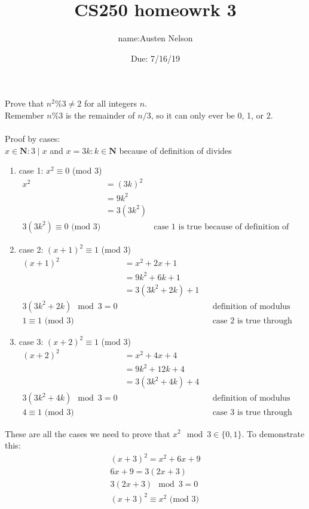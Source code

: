 \documentclass{exam}
\title{CS250 homeowrk 3}
\author{name:Austen Nelson}
\date{Due: 7/16/19}
\newcommand\N{\mathbf{N}}
\begin{document}
\maketitle

\begin{questions}

\question
Prove that $n^2\%3 \ne 2$ for all integers $n$.\\
Remember $n\%3$ is the remainder of $n/3$, so it can only ever be 0, 1, or 2. \\\\
Proof by cases: \\
$x \in \N \colon 3 \mid x$ and $x = 3k \colon k \in \N$  because of definition of divides \\
   \begin{enumerate}
      \item case 1: ${x^2 \equiv 0}$ (mod 3)
   \begin{align*}
      x^2 &= (3k)^2 &&\\
         &= 9k^2 &&\\
         &= 3(3k^2) &&\\
      {3(3k^2) \equiv 0} \text{ (mod 3)} && \text{case 1 is true because of definition of modulus}
   \end{align*}
\item case 2: ${(x+1)^2 \equiv 1}$ (mod 3)
      \begin{align*}
         (x+1)^2 &= x^2+2x+1 \\
            &= 9k^2 +6k + 1 \\
            &= 3(3k^2+2k) + 1 \\
            3(3k^2+2k) \mod 3 = 0 &&& \text{definition of modulus} \\
            {1 \equiv 1} \text{ (mod 3)} &&& \text{case 2 is true through substitution}
      \end{align*}
   \item case 3: ${(x+2)^2 \equiv 1}$ (mod 3)
      \begin{align*}
         (x+2)^2 &= x^2 +4x + 4 &&\\
            &=9k^2 + 12k + 4 &&\\
            &=3(3k^2 +4k) + 4 &&\\
            3(3k^2 +4k) \mod 3 = 0 &&& \text{definition of modulus} \\
            {4 \equiv 1} \text{ (mod 3)} &&& \text{case 3 is true through substitution}
      \end{align*}
   \end{enumerate}
   These are all the cases we need to prove that $x^2 \mod 3 \in \{0, 1\}$. To demonstrate this:
   \begin{align*}
      (x+3)^2 = x^2 + 6x + 9 \\
      6x + 9 = 3(2x + 3) \\
      3(2x+3) \mod 3 = 0 \\
      {(x+3)^2 \equiv x^2} \text{ (mod 3)}
   \end{align*}
\vspace{2in}


\end{questions}
\end{document}

